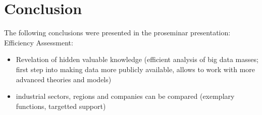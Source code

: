 \chapter{Conclusion}
\label{cha:conclusion}







The following conclusions were presented in the proseminar presentation:
Efficiency Assessment:
\begin{itemize}
    \item Revelation of hidden valuable knowledge (efficient analysis of big data masses; first step into making data more publicly available, allows to work with more advanced theories and models)
    \item industrial sectors, regions and companies can be compared (exemplary functions, targetted support)
\end{itemize}

